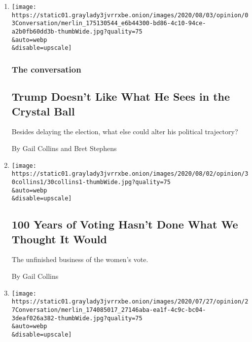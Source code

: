 \begin{enumerate}
\def\labelenumi{\arabic{enumi}.}
\item
  \href{/2020/08/03/opinion/trump-biden-2020.html}{}

  \texttt{[image: https://static01.graylady3jvrrxbe.onion/images/2020/08/03/opinion/03Conversation/merlin\_175130544\_e6b44300-bd86-4c10-94ce-a2b0fb60dd3b-thumbWide.jpg?quality=75\\\&auto=webp\\\&disable=upscale]}

  \hypertarget{the-conversation}{%
  \subsubsection{The conversation}\label{the-conversation}}

  \hypertarget{trump-doesnt-like-what-he-sees-in-the-crystal-ball}{%
  \subsection{Trump Doesn't Like What He Sees in the Crystal
  Ball}\label{trump-doesnt-like-what-he-sees-in-the-crystal-ball}}

  Besides delaying the election, what else could alter his political
  trajectory?

  By Gail Collins and Bret Stephens
\item
  \href{/2020/07/30/opinion/sunday/19th-amendment-women-suffrage.html}{}

  \texttt{[image: https://static01.graylady3jvrrxbe.onion/images/2020/08/02/opinion/30collins1/30collins1-thumbWide.jpg?quality=75\\\&auto=webp\\\&disable=upscale]}

  \hypertarget{100-years-of-voting-hasnt-done-what-we-thought-it-would}{%
  \subsection{100 Years of Voting Hasn't Done What We Thought It
  Would}\label{100-years-of-voting-hasnt-done-what-we-thought-it-would}}

  The unfinished business of the women's vote.

  By Gail Collins
\item
  \href{/2020/07/27/opinion/biden-trump-2020-vp.html}{}

  \texttt{[image: https://static01.graylady3jvrrxbe.onion/images/2020/07/27/opinion/27Conversation/merlin\_174085017\_27146aba-ea1f-4c9c-bc04-3deaf026a382-thumbWide.jpg?quality=75\\\&auto=webp\\\&disable=upscale]}


\end{enumerate}
